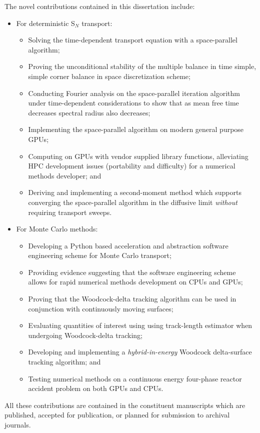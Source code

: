 The novel contributions contained in this dissertation include:
\begin{itemize}
    \item For deterministic S$_N$ transport:
    \begin{itemize}
        \item Solving the time-dependent transport equation with a space-parallel algorithm;
        \item Proving the unconditional stability of the multiple balance in time simple, simple corner balance in space discretization scheme;
        \item Conducting Fourier analysis on the space-parallel iteration algorithm under time-dependent considerations to show that as mean free time decreases spectral radius also decreases; 
        \item Implementing the space-parallel algorithm on modern general purpose GPUs;
        \item Computing on GPUs with vendor supplied library functions, alleviating HPC development issues (portability and difficulty) for a numerical methods developer; and
        \item Deriving and implementing a second-moment method which supports converging the space-parallel algorithm in the diffusive limit \emph{without} requiring transport sweeps.
    \end{itemize}
    \item For Monte Carlo methods:
    \begin{itemize}
        \item Developing a Python based acceleration and abstraction software engineering scheme for Monte Carlo transport;
        \item Providing evidence suggesting that the software engineering scheme allows for rapid numerical methods development on CPUs and GPUs;
        \item Proving that the Woodcock-delta tracking algorithm can be used in conjunction with continuously moving surfaces;
        \item Evaluating quantities of interest using using track-length estimator when undergoing Woodcock-delta tracking;
        \item Developing and implementing a \emph{hybrid-in-energy} Woodcock delta-surface tracking algorithm; and
        \item Testing numerical methods on a continuous energy four-phase reactor accident problem on both GPUs and CPUs.
    \end{itemize}
\end{itemize}
All these contributions are contained in the constituent manuscripts which are published, accepted for publication, or planned for submission to archival journals.

